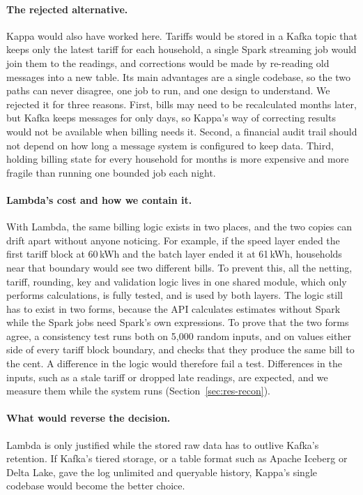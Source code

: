 \documentclass[11pt,a4paper]{article}
\begin{document}
\paragraph{The rejected alternative.} Kappa would also have worked here. Tariffs would be
stored in a Kafka topic that keeps only the latest tariff for each household, a single Spark
streaming job would join them to the readings, and corrections would be made by re-reading
old messages into a new table. Its main advantages are a single codebase, so the two paths
can never disagree, one job to run, and one design to understand. We rejected it for three
reasons. First, bills may need to be recalculated months later, but Kafka keeps messages for
only days, so Kappa's way of correcting results would not be available when billing needs
it. Second, a financial audit trail should not depend on how long a message system is
configured to keep data. Third, holding billing state for every household for months is more
expensive and more fragile than running one bounded job each night.

\paragraph{Lambda's cost and how we contain it.} With Lambda, the same billing logic exists
in two places, and the two copies can drift apart without anyone noticing. For example, if
the speed layer ended the first tariff block at 60\,kWh and the batch layer ended it at
61\,kWh, households near that boundary would see two different bills. To prevent this, all
the netting, tariff, rounding, key and validation logic lives in one shared module, which
only performs calculations, is fully tested, and is used by both layers. The logic still has
to exist in two forms, because the API calculates estimates without Spark while the Spark
jobs need Spark's own expressions. To prove that the two forms agree, a consistency test runs
both on 5{,}000 random inputs, and on values either side of every tariff block boundary, and
checks that they produce the same bill to the cent. A difference in the logic would
therefore fail a test. Differences in the inputs, such as a stale tariff or dropped late
readings, are expected, and we measure them while the system runs
(Section~\ref{sec:res-recon}).

\paragraph{What would reverse the decision.} Lambda is only justified while the stored raw
data has to outlive Kafka's retention. If Kafka's tiered storage, or a table format such as
Apache Iceberg or Delta Lake, gave the log unlimited and queryable history, Kappa's single
codebase would become the better choice.
\end{document}
